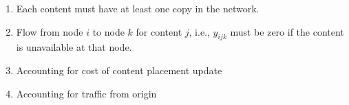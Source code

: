{{\begin{enumerate}
\item
Each content must have at least one copy in the network.






\item
Flow from node $i$  to node $k$ for content $j$, i.e., $y_{ijk}$ must be zero if the content is unavailable at that node.
 



\item
Accounting for cost of content placement update
\item
Accounting for traffic from origin
\end{enumerate}
}
}



%
%
%




